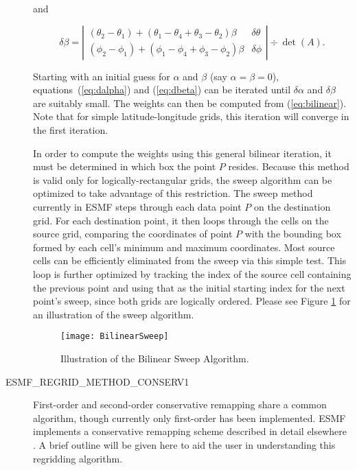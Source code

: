 \begin{description}
     and

\begin{equation}\label{eq:dbeta}
\delta\beta = \left|\begin{array}{cc}
(\theta_2-\theta_1) + (\theta_1-\theta_4+\theta_3-\theta_2)\beta &
\delta\theta \\
(\phi_2-\phi_1) + (\phi_1-\phi_4+\phi_3-\phi_2)\beta &
\delta\phi 
\end{array}\right| \div \det(A).
\end{equation}

     Starting with an initial guess for $\alpha$ and $\beta$ (say 
     $\alpha=\beta=0$), equations~(\ref{eq:dalpha}) and (\ref{eq:dbeta})
     can be iterated until $\delta\alpha$ and $\delta\beta$ are suitably small.
     The weights can then be computed from (\ref{eq:bilinear}).  Note that
     for simple latitude-longitude grids, this iteration will converge in the
     first iteration.

     In order to compute the weights using this general bilinear iteration,
     it must be determined in which box the point $P$ resides.  Because this
     method is valid only for logically-rectangular grids, the sweep algorithm
     can be optimized to take advantage of this restriction.  The sweep
     method currently in ESMF steps through each data point $P$ on the destination
     grid.  For each destination point, it then loops through the cells on the
     source grid, comparing the coordinates of point $P$ with the bounding box
     formed by each cell's minimum and maximum coordinates.  Most source cells can
     be efficiently eliminated from the sweep via this simple test.  This loop is
     further optimized by tracking the index of the source cell containing the
     previous point and using that as the initial starting index for the next
     point's sweep, since both grids are logically ordered.  Please see
     Figure \ref{fig:BilinearSweep} for an illustration of the sweep algorithm.

\begin{center}
\begin{figure}
\caption{Illustration of the Bilinear Sweep Algorithm. }
\label{fig:BilinearSweep}
\texttt{[image: BilinearSweep]}
\end{figure}
\end{center}



\item[ESMF\_REGRID\_METHOD\_CONSERV1]
     First-order and second-order conservative remapping share a common
     algorithm, though currently only first-order has been implemented.
     ESMF implements a conservative remapping scheme described in detail
     elsewhere \cite{Jones1999}.  A brief outline will be given
     here to aid the user in understanding this regridding algorithm.


\end{description}
